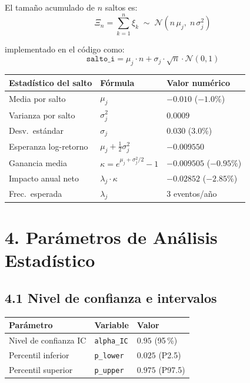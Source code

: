 \documentclass[11pt,letterpaper]{article}
\begin{document}
El tamaño acumulado de $n$ saltos es:
\begin{equation}
    \Xi_n = \sum_{k=1}^{n} \xi_k \;\sim\;
    \mathcal{N}\!\left(n\,\mu_j,\; n\,\sigma_j^2\right)
\end{equation}

implementado en el código como:
\[
    \texttt{salto\_i} = \mu_j \cdot n + \sigma_j \cdot \sqrt{n} \cdot \mathcal{N}(0,1)
\]

\begin{center}
\begin{tabular}{@{}lll@{}}
\toprule
\textbf{Estadístico del salto} & \textbf{Fórmula} & \textbf{Valor numérico} \\
\midrule
Media por salto       & $\mu_j$                              & $-0.010$ ($-1.0\%$) \\
Varianza por salto    & $\sigma_j^2$                         & $0.0009$ \\
Desv.\ estándar       & $\sigma_j$                           & $0.030$ ($3.0\%$) \\
Esperanza log-retorno & $\mu_j + \tfrac{1}{2}\sigma_j^2$     & $-0.009550$ \\
Ganancia media        & $\kappa = e^{\mu_j+\sigma_j^2/2}-1$  & $-0.009505$ ($-0.95\%$) \\
Impacto anual neto    & $\lambda_j \cdot \kappa$              & $-0.02852$ ($-2.85\%$) \\
Frec.\ esperada       & $\lambda_j$                          & 3 eventos/año \\
\bottomrule
\end{tabular}
\end{center}

\section*{4. Parámetros de Análisis Estadístico}

\subsection*{4.1 Nivel de confianza e intervalos}

\begin{center}
\begin{tabular}{@{}lll@{}}
\toprule
\textbf{Parámetro} & \textbf{Variable} & \textbf{Valor} \\
\midrule
Nivel de confianza IC & \texttt{alpha\_IC} & $0.95$ (95\,\%) \\
Percentil inferior    & \texttt{p\_lower}  & $0.025$ (P2.5) \\
Percentil superior    & \texttt{p\_upper}  & $0.975$ (P97.5) \\
\bottomrule
\end{tabular}
\end{center}
\end{document}

